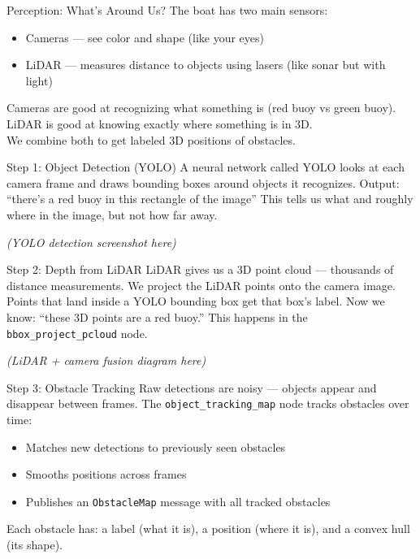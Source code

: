 \documentclass[aspectratio=169]{beamer}
\begin{document}
\begin{frame}{Perception: What's Around Us?}
    The boat has two main sensors:
    \vfill
    \begin{itemize}
        \item Cameras --- see color and shape (like your eyes)
        \item LiDAR --- measures distance to objects using lasers (like sonar but with light)
    \end{itemize}
    \vfill
    Cameras are good at recognizing what something is (red buoy vs green buoy).\\
    LiDAR is good at knowing exactly where something is in 3D.\\
    \vfill
    We combine both to get labeled 3D positions of obstacles.
\end{frame}

\begin{frame}{Step 1: Object Detection (YOLO)}
    A neural network called YOLO looks at each camera frame and draws bounding boxes around objects it recognizes.
    \vfill
    Output: ``there's a red buoy in this rectangle of the image''
    \vfill
    This tells us what and roughly where in the image, but not how far away.
    \vfill
    \begin{center}
        \textit{(YOLO detection screenshot here)}
    \end{center}
\end{frame}

\begin{frame}{Step 2: Depth from LiDAR}
    LiDAR gives us a 3D point cloud --- thousands of distance measurements.
    \vfill
    We project the LiDAR points onto the camera image. Points that land inside a YOLO bounding box get that box's label.
    \vfill
    Now we know: ``these 3D points are a red buoy.''
    \vfill
    This happens in the \texttt{bbox\_project\_pcloud} node.
    \vfill
    \begin{center}
        \textit{(LiDAR + camera fusion diagram here)}
    \end{center}
\end{frame}

\begin{frame}{Step 3: Obstacle Tracking}
    Raw detections are noisy --- objects appear and disappear between frames.
    \vfill
    The \texttt{object\_tracking\_map} node tracks obstacles over time:
    \begin{itemize}
        \item Matches new detections to previously seen obstacles
        \item Smooths positions across frames
        \item Publishes an \texttt{ObstacleMap} message with all tracked obstacles
    \end{itemize}
    \vfill
    Each obstacle has: a label (what it is), a position (where it is), and a convex hull (its shape).
\end{frame}
\end{document}
